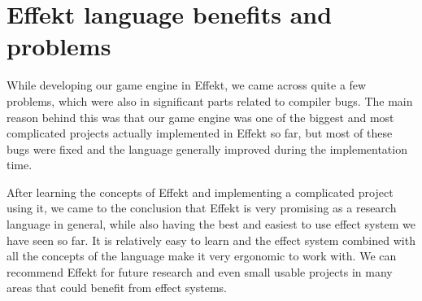 \section*{Effekt language benefits and problems}

While developing our game engine in Effekt, we came across quite a few problems, which were also in significant parts related to compiler bugs. The main reason behind this was that our game engine was one of the biggest and most complicated projects actually implemented in Effekt so far, but most of these bugs were fixed and the language generally improved during the implementation time.

After learning the concepts of Effekt and implementing a complicated project using it, we came to the conclusion that Effekt is very promising as a research language in general, while also having the best and easiest to use effect system we have seen so far. It is relatively easy to learn and the effect system combined with all the concepts of the language make it very ergonomic to work with. We can recommend Effekt for future research and even small usable projects in many areas that could benefit from effect systems.
